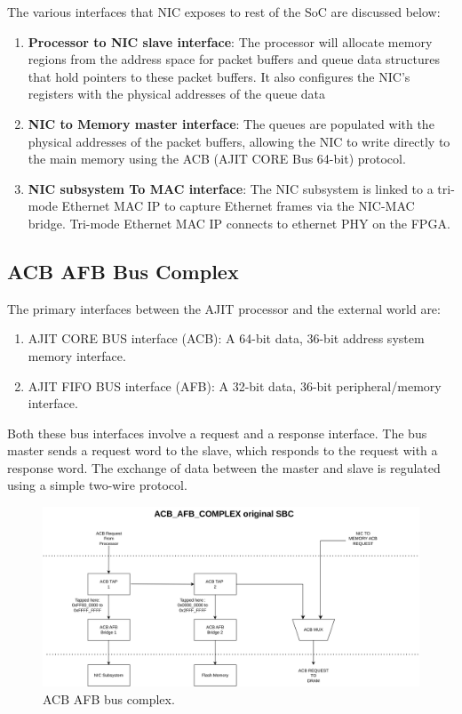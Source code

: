 \documentclass[12pt]{report}
\begin{document}
The various interfaces that NIC exposes to rest of the SoC are discussed below:\\
\begin{enumerate}
    \item \textbf{Processor to NIC slave interface}:
The processor will allocate memory regions from the address space for packet buffers and queue data structures that hold pointers to these packet buffers. It also configures the NIC's registers with the physical addresses of the queue data 

\item \textbf{NIC to Memory master interface}:
 The queues are populated with the physical addresses of the packet buffers, allowing the NIC to write directly to the main memory using the ACB (AJIT CORE Bus 64-bit) protocol. 

 \item \textbf{NIC subsystem To MAC interface}:
The NIC subsystem is linked to a tri-mode Ethernet MAC IP to capture Ethernet frames via the NIC-MAC bridge. Tri-mode Ethernet MAC IP connects to ethernet PHY on the FPGA.
\end{enumerate}

  
\subsection{ACB AFB Bus Complex}
The primary interfaces between the AJIT processor and the external
world are:
\begin{enumerate}
    \item AJIT CORE BUS interface (ACB): A 64-bit data, 36-bit address system memory interface.
    \item AJIT FIFO BUS interface (AFB): A 32-bit data, 36-bit peripheral/memory
interface.
\end{enumerate}

Both these bus interfaces involve a request and a response interface. The
bus master sends a request word to the slave, which responds to the request
with a response word. The exchange of data between the master and slave
is regulated using a simple two-wire protocol.

\begin{figure}[h]
			\centering
			\includegraphics[width=16cm]{../figures/acb_afb_complex.jpg}
			\caption{ACB AFB bus complex.}
			
		\end{figure}
\end{document}
